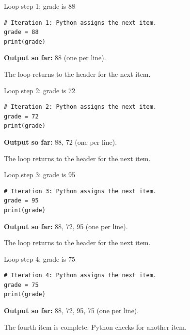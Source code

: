 \documentclass[aspectratio=169,12pt]{beamer}
\begin{document}
\begin{frame}[fragile]{Loop step 1: grade is 88}
\begin{lstlisting}
# Iteration 1: Python assigns the next item.
grade = 88
print(grade)
\end{lstlisting}
\textbf{Output so far:} 88 (one per line).
\par The loop returns to the header for the next item.

\end{frame}
\begin{frame}[fragile]{Loop step 2: grade is 72}
\begin{lstlisting}
# Iteration 2: Python assigns the next item.
grade = 72
print(grade)
\end{lstlisting}
\textbf{Output so far:} 88, 72 (one per line).
\par The loop returns to the header for the next item.

\end{frame}
\begin{frame}[fragile]{Loop step 3: grade is 95}
\begin{lstlisting}
# Iteration 3: Python assigns the next item.
grade = 95
print(grade)
\end{lstlisting}
\textbf{Output so far:} 88, 72, 95 (one per line).
\par The loop returns to the header for the next item.

\end{frame}
\begin{frame}[fragile]{Loop step 4: grade is 75}
\begin{lstlisting}
# Iteration 4: Python assigns the next item.
grade = 75
print(grade)
\end{lstlisting}
\textbf{Output so far:} 88, 72, 95, 75 (one per line).
\par The fourth item is complete. Python checks for another item.

\end{frame}
\end{document}
